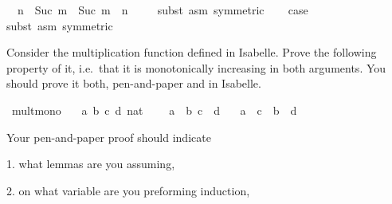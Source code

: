\begin{isabellebody}
\ {}{\isacharcolon}{\kern0pt}\ {\isachardoublequoteopen}n\ {\isacharplus}{\kern0pt}\ {\isacharparenleft}{\kern0pt}Suc\ m{\isacharparenright}{\kern0pt}\ {\isacharequal}{\kern0pt}\ Suc\ {\isacharparenleft}{\kern0pt}m\ {\isacharplus}{\kern0pt}\ n{\isacharparenright}{\kern0pt}{\isachardoublequoteclose}\isanewline
\ \ \ \ \isamarkupfalse%
{\isacharparenleft}{\kern0pt}subst\ {\isacharparenleft}{\kern0pt}asm{\isacharparenright}{\kern0pt}\ {}{\isacharbrackleft}{\kern0pt}symmetric{\isacharbrackright}{\kern0pt}{\isacharparenright}{\kern0pt}\isanewline
\isanewline
\ \ \isamarkupfalse%
\ {\isacharquery}{\kern0pt}case\isanewline
\ \ \ \ \isamarkupfalse%
{\isacharparenleft}{\kern0pt}subst\ {\isacharparenleft}{\kern0pt}asm{\isacharparenright}{\kern0pt}\ {}{\isacharbrackleft}{\kern0pt}symmetric{\isacharbrackright}{\kern0pt}{\isacharparenright}{\kern0pt}\isanewline
\isanewline
{}\isamarkupfalse%
%
\endisatagproof
{\isafoldproof}%
%
\isadelimproof
%
\endisadelimproof
%
\begin{isamarkuptext}%
%
\end{isamarkuptext}\isamarkuptrue%
%
\begin{isamarkuptext}%
Consider the multiplication function \isa{{\isacharparenleft}{\kern0pt}{\isacharasterisk}{\kern0pt}{\isacharparenright}{\kern0pt}} defined in Isabelle. Prove the following
      property of it, i.e.\ that it is monotonically increasing in both arguments. You should prove
      it both, pen-and-paper and in Isabelle.%
\end{isamarkuptext}\isamarkuptrue%
\isamarkupfalse%
\ mult{\isacharunderscore}{\kern0pt}mono{\isacharcolon}{\kern0pt}\isanewline
\ \ \ a\ b\ c\ d{\isacharcolon}{\kern0pt}{\isacharcolon}{\kern0pt}\ nat\ %
\isanewline
\ \ \ {\isachardoublequoteopen}a\ {\isasymle}\ b{\isachardoublequoteclose}\ {\isachardoublequoteopen}c\ {\isasymle}\ d{\isachardoublequoteclose}\isanewline
\ \ \ {\isachardoublequoteopen}a\ {\isacharasterisk}{\kern0pt}\ c\ {\isasymle}\ b\ {\isacharasterisk}{\kern0pt}\ d{\isachardoublequoteclose}%
\begin{isamarkuptext}%
Your pen-and-paper proof should indicate

 1. what lemmas are you assuming,

 2. on what variable are you preforming induction,


\end{isamarkuptext}
\end{isabellebody}

